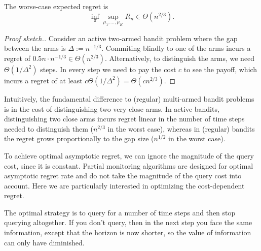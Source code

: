 \documentclass[a4paper]{article}
\def\regret{R}
\begin{document}

\begin{proposition}
The worse-case expected regret is
\[
\inf_\pi \sup_{\mu_1, \ldots, \mu_K} \regret_n \in \Theta(n^{2/3}).
\]
\end{proposition}
\begin{proof}[Proof sketch.]
Consider an active two-armed bandit problem
where the gap between the arms is $\Delta := n^{-1/3}$.
Commiting blindly to one of the arms incurs a regret of
$0.5n \cdot n^{-1/3} \in \Theta(n^{2/3})$.
Alternatively, to distinguish the arms,
we need $\Theta(1/\Delta^2)$ steps.
In every step we need to pay the cost $c$ to see the payoff,
which incurs a regret of
at least $c\Theta(1/\Delta^2) = \Theta(cn^{2/3})$.
\end{proof}

Intuitively, the fundamental difference to (regular) multi-armed bandit problems is in the cost of distinguishing two very close arms.
In active bandits, distinguishing two close arms incurs regret linear in the number of time steps needed to distinguish them ($n^{2/3}$ in the worst case), whereas in (regular) bandits the regret grows proportionally to the gap size ($n^{1/2}$ in the worst case).

To achieve optimal asymptotic regret, we can ignore the magnitude of the query cost, since it is constant.
Partial monitoring algorithms are designed for optimal asymptotic regret rate and do not take the magnitude of the query cost into account.
Here we are particularly interested in optimizing
the cost-dependent regret.

The optimal strategy is to query for a number of time steps
and then stop querying altogether.
If you don't query, then in the next step you face the same information,
except that the horizon is now shorter,
so the value of information can only have diminished.
\end{document}
